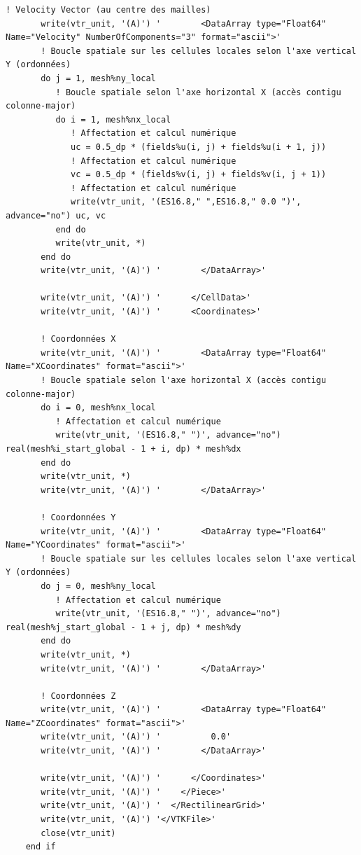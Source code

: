 \documentclass[10pt,a4paper,oneside]{book}
\begin{document}
\begin{lstlisting}[language={[95]Fortran}]
       ! Velocity Vector (au centre des mailles)
       write(vtr_unit, '(A)') '        <DataArray type="Float64" Name="Velocity" NumberOfComponents="3" format="ascii">'
       ! Boucle spatiale sur les cellules locales selon l'axe vertical Y (ordonnées)
       do j = 1, mesh%ny_local
          ! Boucle spatiale selon l'axe horizontal X (accès contigu colonne-major)
          do i = 1, mesh%nx_local
             ! Affectation et calcul numérique
             uc = 0.5_dp * (fields%u(i, j) + fields%u(i + 1, j))
             ! Affectation et calcul numérique
             vc = 0.5_dp * (fields%v(i, j) + fields%v(i, j + 1))
             ! Affectation et calcul numérique
             write(vtr_unit, '(ES16.8," ",ES16.8," 0.0 ")', advance="no") uc, vc
          end do
          write(vtr_unit, *)
       end do
       write(vtr_unit, '(A)') '        </DataArray>'

       write(vtr_unit, '(A)') '      </CellData>'
       write(vtr_unit, '(A)') '      <Coordinates>'

       ! Coordonnées X
       write(vtr_unit, '(A)') '        <DataArray type="Float64" Name="XCoordinates" format="ascii">'
       ! Boucle spatiale selon l'axe horizontal X (accès contigu colonne-major)
       do i = 0, mesh%nx_local
          ! Affectation et calcul numérique
          write(vtr_unit, '(ES16.8," ")', advance="no") real(mesh%i_start_global - 1 + i, dp) * mesh%dx
       end do
       write(vtr_unit, *)
       write(vtr_unit, '(A)') '        </DataArray>'

       ! Coordonnées Y
       write(vtr_unit, '(A)') '        <DataArray type="Float64" Name="YCoordinates" format="ascii">'
       ! Boucle spatiale sur les cellules locales selon l'axe vertical Y (ordonnées)
       do j = 0, mesh%ny_local
          ! Affectation et calcul numérique
          write(vtr_unit, '(ES16.8," ")', advance="no") real(mesh%j_start_global - 1 + j, dp) * mesh%dy
       end do
       write(vtr_unit, *)
       write(vtr_unit, '(A)') '        </DataArray>'

       ! Coordonnées Z
       write(vtr_unit, '(A)') '        <DataArray type="Float64" Name="ZCoordinates" format="ascii">'
       write(vtr_unit, '(A)') '          0.0'
       write(vtr_unit, '(A)') '        </DataArray>'

       write(vtr_unit, '(A)') '      </Coordinates>'
       write(vtr_unit, '(A)') '    </Piece>'
       write(vtr_unit, '(A)') '  </RectilinearGrid>'
       write(vtr_unit, '(A)') '</VTKFile>'
       close(vtr_unit)
    end if


\end{lstlisting}
\end{document}

